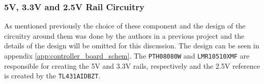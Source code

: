 \subsubsection{5V, 3.3V and 2.5V Rail Circuitry} %
\label{subsub:pth08080w}
As mentioned previously the choice of these component and the design of the circuitry around them was done by the authors in a previous project \cite{isaswarm} and the details of the design will be omitted for this discussion.
The design can be seen in appendix \ref{app:controller_board_schem}.
The \texttt{PTH08080W} and \texttt{LMR10510XMF} are responsible for creating the 5V and 3.3V rails, respectively and the 2.5V reference is created by the \texttt{TL431AIDBZT}.
